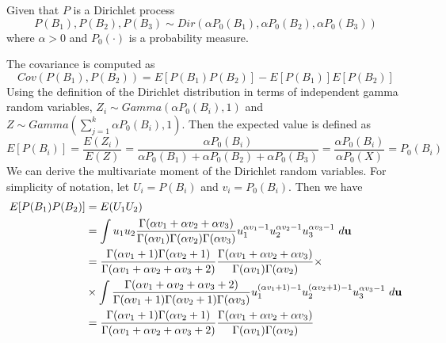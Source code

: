 \documentclass[a4paper, 10pt]{article}
\newcommand{\ds}{ \displaystyle }
\newcommand{\alphaPo}[1]{ \alpha P_0(#1) }
\newcommand{\Po}[1]{ P_0(#1) }
\newcommand{\Bi}[1]{B_#1}
\begin{document}
\begin{enumerate}
    Given that $P$ is a Dirichlet process
    $$P(B_1), P(B_2), P(B_3) \sim Dir(\alphaPo{B_1}, \alphaPo{B_2}, \alphaPo{B_3})$$
    where $\alpha > 0$ and $\Po{\cdot}$ is a probability measure.
    
    The covariance is computed as $$Cov(P(\Bi{1}), P(\Bi{2}))=E[P(\Bi{1})P(\Bi{2})] - E[P(\Bi{1})]E[P(\Bi{2})]$$
    Using the definition of the Dirichlet distribution in terms of independent gamma random variables, $Z_i \sim Gamma(\alphaPo{B_i}, 1)$ and $Z \sim Gamma(\sum_{j = 1}^{k} \alphaPo{B_i},1)$. Then the expected value is defined as
    $$ E[P(\Bi{i})] = \frac{E(Z_i)}{E(Z)} = \frac{\alphaPo{B_i}}{\alphaPo{B_1} + \alphaPo{B_2} + \alphaPo{B_3}} = \frac{\alphaPo{B_i}}{\alphaPo{X}} = P_0(B_i)$$
    We can derive the multivariate moment of the Dirichlet random variables. For simplicity of notation, let $U_i = P(B_i)$ and $v_i = P_0(B_i)$. Then we have
    \begin{align*}
        E[P(\Bi{1}) P(\Bi{2})] &= E(U_1 U_2)\\
        &= \int u_1 u_2 \frac{\Gamma(\alpha v_1 + \alpha v_2 + \alpha v_3)}
                            {\Gamma(\alpha v_1)\Gamma(\alpha v_2)\Gamma(\alpha v_3)}
                            u_1^{\alpha v_1 - 1} u_2^{\alpha v_2 - 1} u_3^{\alpha v_3 - 1}
                            ~d\mathbf u\\
        &= \ds\frac{\Gamma(\alpha v_1 +1)\Gamma(\alpha v_2 +1)}
                            {\Gamma(\alpha v_1 + \alpha v_2 + \alpha v_3 + 2)}
                            \ds\frac {\Gamma(\alpha v_1 + \alpha v_2 + \alpha v_3)}
                            {\Gamma(\alpha v_1)\Gamma(\alpha v_2)} \times\\
                            \vspace{.9em}
                        &  \times \int\frac{\Gamma(\alpha v_1 + \alpha v_2 + \alpha v_3 + 2)}
                            {\Gamma(\alpha v_1+1)\Gamma(\alpha v_2+1)\Gamma(\alpha v_3)}
                            u_1^{(\alpha v_1 + 1) - 1} u_2^{(\alpha v_2 + 1) - 1} u_3^{\alpha v_3 - 1}
                            ~d\mathbf u\\
                        &= \frac{\Gamma(\alpha v_1 +1)\Gamma(\alpha v_2 +1)}
                            {\Gamma(\alpha v_1 + \alpha v_2 + \alpha v_3 + 2)}
                            \ds\frac {\Gamma(\alpha v_1 + \alpha v_2 + \alpha v_3)}
                            {\Gamma(\alpha v_1)\Gamma(\alpha v_2)}\\

\end{align*}
\end{enumerate}
\end{document}

